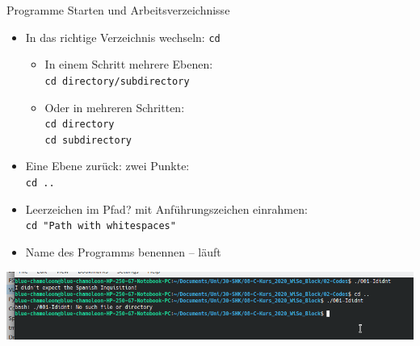 \begin{frame}{Programme Starten und Arbeitsverzeichnisse}
%
\begin{itemize}
\item In das richtige Verzeichnis wechseln: \texttt{cd}
	\begin{minipage}{\linewidth}
		\begin{minipage}{.49\linewidth}
		\begin{itemize}
		\item In einem Schritt mehrere Ebenen:\\
			\texttt{cd directory/subdirectory}
		\end{itemize}
		\end{minipage}
		\begin{minipage}{.49\linewidth}
		\begin{itemize}
		\item Oder in mehreren Schritten:\\
			\texttt{cd directory}\\
			\texttt{cd subdirectory}
		\end{itemize}
		\end{minipage}
	\end{minipage}
	\item Eine Ebene zurück: zwei Punkte:\\
		\texttt{cd ..}
	\item Leerzeichen im Pfad? \Thus mit Anführungszeichen einrahmen:\\
		\texttt{cd "Path with whitespaces"}
\item Name des Programms benennen -- läuft
\end{itemize}
%
\includegraphics[width=\linewidth]{./gfx/RunRunnot}
%
\end{frame}


